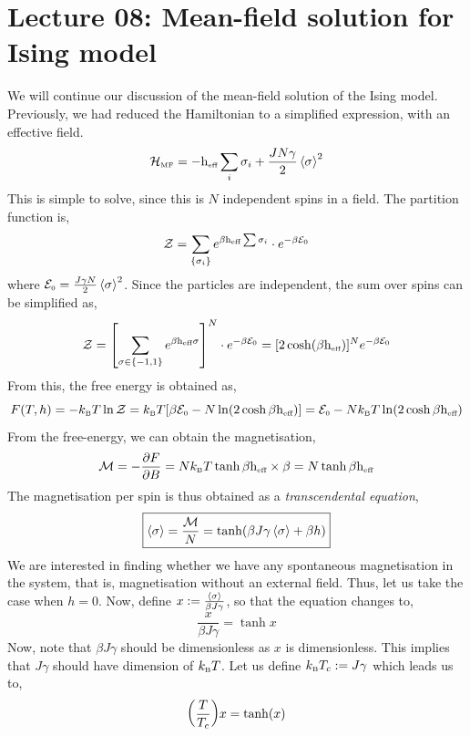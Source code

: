 \section*{Lecture 08: Mean-field solution for Ising model}
We will continue our discussion of the mean-field solution of the Ising model. Previously, we had reduced the Hamiltonian to a simplified expression, with an effective field. 
\begin{align}\label{mfham}
    \mathcal H_{\text{\tiny MF}} =  -\mathrm{h}_{\text{\tiny eff}} \sum_i \sigma_i +\frac{JN\gamma}{2}\left\langle \sigma \right\rangle^2
\end{align}
This is simple to solve, since this is $N$ independent spins in a field. The partition function is, 
\begin{align}
    \mathcal Z = \sum_{\{\sigma_i\}} e^{\beta \mathrm{h}_{\text{\tiny eff}}\sum \sigma_i} \cdot e^{-\beta\mathcal E_{\text{\tiny 0}}}
\end{align} 
where $\mathcal E_{\text{\tiny 0}} = \frac{J\gamma N}{2}\left\langle \sigma \right\rangle^2$. Since the particles are independent, the sum over spins can be simplified as,
$$\mathcal Z = \qty[\sum\limits_{\sigma\in \{-1,1\}} e^{\beta \mathrm{h}_{\text{\tiny eff}} \sigma}]^N \cdot e^{-\beta \mathcal E_{\text{\tiny 0}}} = [2\cosh(\beta \mathrm{h}_{\text{\tiny eff}})]^N e^{-\beta\mathcal E_{\text{\tiny 0}}}$$
From this, the free energy is obtained as,
$$F(T,h) = -k_{\text{\tiny B}} T \ln \mathcal Z = k_{\text{\tiny B}} T[\beta\mathcal E_{\text{\tiny 0}} - N\ln(2\cosh\beta \mathrm{h}_{\text{\tiny eff}})] = \mathcal E_{\text{\tiny 0}} - Nk_{\text{\tiny B}} T\ln(2\cosh \beta \mathrm{h}_{\text{\tiny eff}})$$
From the free-energy, we can obtain the magnetisation,
$$\mathcal M = -\pdv{F}{B} = Nk_{\text{\tiny B}} T \tanh \beta \mathrm{h}_{\text{\tiny eff}}\times \beta = N\tanh \beta \mathrm{h}_{\text{\tiny eff}}$$
The magnetisation per spin is thus obtained as a \textit{transcendental equation},
\begin{equation}
    \boxed{\left\langle \sigma \right\rangle = \frac{\mathcal M}{N} = \tanh(\beta J\gamma\left\langle \sigma \right\rangle+ \beta h)}
    \label{transcendeq}
\end{equation}
We are interested in finding whether we have any spontaneous magnetisation in the system, that is, magnetisation without an external field. Thus, let us take the case when $h=0$. Now, define $x:= \frac{\left\langle \sigma \right\rangle}{\beta J \gamma}$, so that the equation changes to,
$$\frac{x}{\beta J \gamma} = \tanh x$$
Now, note that $\beta J \gamma$ should be dimensionless as $x$ is dimensionless. This implies that $J\gamma$ should have dimension of $k_{\text{\tiny B}} T$. Let us define $k_{\text{\tiny B}} T_c:=J\gamma$ which leads us to,
$$\qty(\frac{T}{T_c})x = \tanh(x)$$ 
